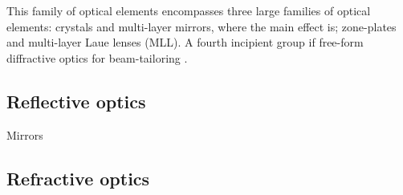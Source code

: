 \begin{refsection}
This family of optical elements encompasses three large families of optical elements: crystals and multi-layer mirrors, where the main effect is; zone-plates and multi-layer Laue lenses (MLL). A fourth incipient group if free-form diffractive optics for beam-tailoring . 

\subsection{Reflective optics}\label{sec:reflec}
Mirrors 

\subsection{Refractive optics}\label{sec:refractive_optics}


\end{refsection}
